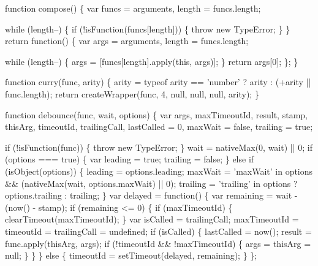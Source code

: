 \begin{DoxyCodeInclude}
    \textcolor{keyword}{function} compose() \{
      var funcs = arguments,
          length = funcs.length;

      \textcolor{keywordflow}{while} (length--) \{
        \textcolor{keywordflow}{if} (!isFunction(funcs[length])) \{
          \textcolor{keywordflow}{throw} \textcolor{keyword}{new} TypeError;
        \}
      \}
      \textcolor{keywordflow}{return} \textcolor{keyword}{function}() \{
        var args = arguments,
            length = funcs.length;

        \textcolor{keywordflow}{while} (length--) \{
          args = [funcs[length].apply(\textcolor{keyword}{this}, args)];
        \}
        \textcolor{keywordflow}{return} args[0];
      \};
    \}

    \textcolor{keyword}{function} curry(func, arity) \{
      arity = typeof arity == \textcolor{stringliteral}{'number'} ? arity : (+arity || func.length);
      \textcolor{keywordflow}{return} createWrapper(func, 4, null, null, null, arity);
    \}

    \textcolor{keyword}{function} debounce(func, wait, options) \{
      var args,
          maxTimeoutId,
          result,
          stamp,
          thisArg,
          timeoutId,
          trailingCall,
          lastCalled = 0,
          maxWait = \textcolor{keyword}{false},
          trailing = \textcolor{keyword}{true};

      \textcolor{keywordflow}{if} (!isFunction(func)) \{
        \textcolor{keywordflow}{throw} \textcolor{keyword}{new} TypeError;
      \}
      wait = nativeMax(0, wait) || 0;
      \textcolor{keywordflow}{if} (options === \textcolor{keyword}{true}) \{
        var leading = \textcolor{keyword}{true};
        trailing = \textcolor{keyword}{false};
      \} \textcolor{keywordflow}{else} \textcolor{keywordflow}{if} (isObject(options)) \{
        leading = options.leading;
        maxWait = \textcolor{stringliteral}{'maxWait'} in options && (nativeMax(wait, options.maxWait) || 0);
        trailing = \textcolor{stringliteral}{'trailing'} in options ? options.trailing : trailing;
      \}
      var delayed = \textcolor{keyword}{function}() \{
        var remaining = wait - (now() - stamp);
        \textcolor{keywordflow}{if} (remaining <= 0) \{
          \textcolor{keywordflow}{if} (maxTimeoutId) \{
            clearTimeout(maxTimeoutId);
          \}
          var isCalled = trailingCall;
          maxTimeoutId = timeoutId = trailingCall = undefined;
          \textcolor{keywordflow}{if} (isCalled) \{
            lastCalled = now();
            result = func.apply(thisArg, args);
            \textcolor{keywordflow}{if} (!timeoutId && !maxTimeoutId) \{
              args = thisArg = null;
            \}
          \}
        \} \textcolor{keywordflow}{else} \{
          timeoutId = setTimeout(delayed, remaining);
        \}
      \};


\end{DoxyCodeInclude}
